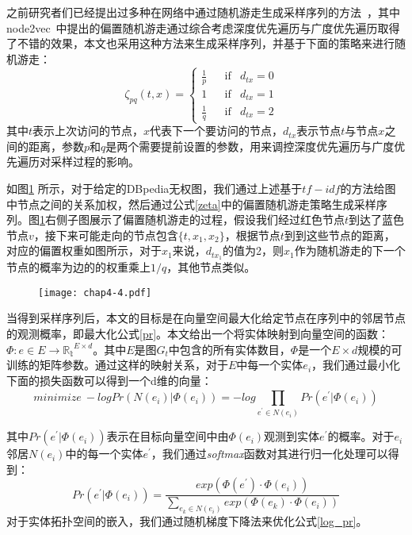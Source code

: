 \noindent 之前研究者们已经提出过多种在网络中通过随机游走生成采样序列的方法~\cite{kdd/Perozzi14, kdd/GroverL16}，其中node2vec~\cite{kdd/GroverL16}中提出的偏置随机游走通过综合考虑深度优先遍历与广度优先遍历取得了不错的效果，本文也采用这种方法来生成采样序列，并基于下面的策略来进行随机游走：
\begin{equation}
    \label{zeta}
    \zeta_{pq}(t,x) = \left\{\begin{matrix}
        \frac{1}{p} && \text{if} & d_{tx} = 0 & \\
        1           && \text{if} & d_{tx} = 1 & \\
        \frac{1}{q} && \text{if} & d_{tx} = 2 & 
        \end{matrix}\right.
\end{equation} 
\noindent 其中$t$表示上次访问的节点，$x$代表下一个要访问的节点，$d_{tx}$表示节点$t$与节点$x$之间的距离，参数$p$和$q$是两个需要提前设置的参数，用来调控深度优先遍历与广度优先遍历对采样过程的影响。

如图\ref{chap4-4} 所示，对于给定的DBpedia无权图，我们通过上述基于$tf-idf$的方法给图中节点之间的关系加权，然后通过公式\ref{zeta}中的偏置随机游走策略生成采样序列。图\ref{chap4-4}右侧子图展示了偏置随机游走的过程，假设我们经过红色节点$t$到达了蓝色节点$v$，接下来可能走向的节点包含$\{t, x_1, x_2\}$，根据节点$t$到到这些节点的距离，对应的偏置权重如图所示，对于$x_1$来说，$d_{tx_1}$的值为2，则$x_1$作为随机游走的下一个节点的概率为边的的权重乘上$1/q$，其他节点类似。

\begin{figure}[!ht]
    \centerline{\texttt{[image: chap4-4.pdf]}}
    \label{chap4-4}
\end{figure}

当得到采样序列后，本文的目标是在向量空间最大化给定节点在序列中的邻居节点的观测概率，即最大化公式\ref{pr}。本文给出一个将实体映射到向量空间的函数：$\Phi: e \in E \rightarrow \mathbb{R_t}^{E \times d}$。其中$E$是图$G_t$中包含的所有实体数目，$\Phi$是一个$E \times d$规模的可训练的矩阵参数。通过这样的映射关系，对于$E$中每一个实体$e_i$，我们通过最小化下面的损失函数可以得到一个d维的向量：
\begin{equation}
    \label{log_pr}
    minimize\ -log Pr(N(e_i)|\Phi(e_i)) = -log\prod_{e^{'} \in N(e_i)}^{ }Pr(e^{'}|\Phi(e_i))
\end{equation}

\noindent 其中$Pr(e^{'}|\Phi(e_i))$表示在目标向量空间中由$\Phi(e_i)$观测到实体$e^{'}$的概率。对于$e_i$邻居$N(e_i)$中的每一个实体$e^{'}$，我们通过\emph{softmax}函数对其进行归一化处理可以得到：
\begin{equation}
    Pr(e^{'}|\Phi(e_i)) = \frac{exp(\Phi(e^{'})\cdot \Phi(e_i))}{\sum_{e_k \in N(e_i)}^{ }exp(\Phi(e_k)\cdot \Phi(e_i))}
\end{equation}
\noindent 对于实体拓扑空间的嵌入，我们通过随机梯度下降法来优化公式\ref{log_pr}。


